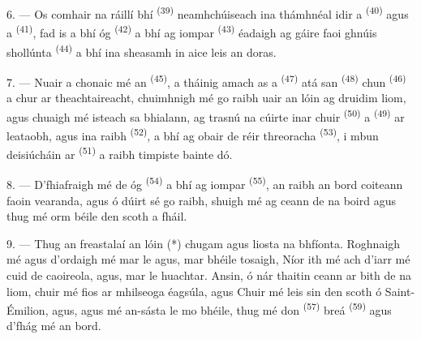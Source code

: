 \VUsaut{4.0mm}
\VUsaut{3.0mm}

6. --- Os comhair na ráillí bhí  \textsuperscript{(39)}
neamhchúiseach ina thámhnéal idir a  \textsuperscript{(40)}
agus a  \textsuperscript{(41)}, fad is a bhí  óg \textsuperscript{(42)} a bhí ag iompar 
\textsuperscript{(43)} éadaigh ag gáire faoi ghnúis shollúnta  \textsuperscript{(44)} a bhí ina sheasamh in aice leis an doras.

7. --- Nuair a chonaic mé an  \textsuperscript{(45)}, a tháinig
amach as a  \textsuperscript{(47)} atá san 
\textsuperscript{(48)} chun  \textsuperscript{(46)} a chur
ar theachtaireacht, chuimhnigh mé go raibh uair an lóin ag druidim liom, agus chuaigh
mé isteach sa bhialann, ag trasnú na cúirte inar chuir  \textsuperscript{(50)} a  \textsuperscript{(49)} ar
leataobh, agus ina raibh  \textsuperscript{(52)}, a bhí ag obair de
réir threoracha  \textsuperscript{(53)}, i mbun deisiúcháin ar
 \textsuperscript{(51)} a raibh timpiste bainte dó.

8. --- D'fhiafraigh mé de  óg \textsuperscript{(54)} a bhí ag iompar
 \textsuperscript{(55)}, an raibh an bord coiteann faoin
vearanda, agus ó dúirt sé go raibh, shuigh mé ag ceann de na boird agus thug mé orm
béile den scoth a fháil.


\VUsaut{4.0mm}
\VUsaut{3.0mm}

9. --- Thug an freastalaí  an lóin (*) chugam agus liosta na
bhfíonta. Roghnaigh mé agus d'ordaigh mé mar  le
 agus, mar bhéile tosaigh,  Níor ith mé
 ach d'iarr mé cuid de  caoireola, agus, mar
 le huachtar. Ansin, ó nár thaitin ceann ar bith
de na  liom, chuir mé fios ar mhilseoga éagsúla,
\nl
{} agus  Chuir mé leis sin  den scoth ó
Saint-Émilion, agus, agus mé an-sásta le mo bhéile, thug mé don
 \textsuperscript{(57)}  breá
\textsuperscript{(59)} agus d'fhág mé an bord.

